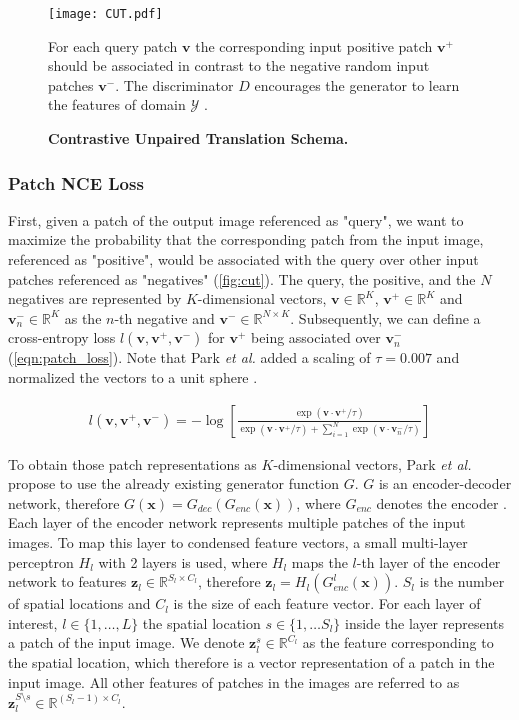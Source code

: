 \documentclass[a4paper,11pt, DIV=12]{scrartcl}
\newcommand{\x}{\boldsymbol{x}}
\newcommand{\vp}{\boldsymbol{v}^+}
\newcommand{\vm}{\boldsymbol{v}^-}
\newcommand{\ve}{\boldsymbol{v}}
\begin{document}
\begin{figure}[htp!]
   \centering
   \texttt{[image: CUT.pdf]}
   \caption{
      \textbf{Contrastive Unpaired Translation Schema.}}
   For \textcolor{query}{each query patch} $\ve$ the \textcolor{positive}{corresponding input positive patch} $\vp$ should be associated in contrast to the \textcolor{negative}{negative random input patches} $\vm$.
   The discriminator $D$ encourages the generator to learn the features of domain $\mathcal{Y}$ \cite{cut}.
   \label{fig:cut}
\end{figure}

\subsubsection*{Patch NCE Loss}
First, given a patch of the output image referenced as "query", we want to maximize the probability that the corresponding
patch from the input image, referenced as "positive", would be associated with the query over other input patches referenced
as "negatives" (\autoref{fig:cut}).
The query, the positive, and the $N$ negatives are represented by $K$-dimensional vectors, $\ve \in \mathbb{R}^K$, $\vp \in \mathbb{R}^K$
and $\vm_n \in \mathbb{R}^K$ as the $n$-th negative and $\ve^- \in \mathbb{R}^{N \times K}$.
Subsequently, we can define a cross-entropy loss $l(\ve, \vp, \vm)$ for $\vp$ being associated over $\vm_n$ (\autoref{eqn:patch_loss}).
Note that Park \textit{et al.} added a scaling of $\tau = 0.007$ and normalized the vectors to a unit sphere \cite{cut}.

\begin{equation}
   \label{eqn:patch_loss}
   \begin{aligned}
      l(\ve, \vp, \vm) = - \log \left[ \frac{\exp(\ve \cdot \vp / \tau)}{\exp(\ve \cdot \vp / \tau) + \sum_{i=1}^N\exp(\ve \cdot \ve_n^- / \tau)}\right]
   \end{aligned}
\end{equation}

To obtain those patch representations as $K$-dimensional vectors, Park \textit{et al.} propose to use the already existing
generator function $G$. $G$ is an encoder-decoder network, therefore $G(\x) = G_{dec}(G_{enc}(\x))$, where $G_{enc}$ denotes the encoder \cite{cut}.
Each layer of the encoder network represents multiple patches of the input images. To map this layer to condensed feature vectors,
a small multi-layer perceptron $H_l$ with 2 layers is used, where $H_l$ maps the $l$-th layer of the encoder network to features
$\boldsymbol{z}_l \in \mathbb{R}^{S_l \times C_l}$, therefore $\boldsymbol{z}_l = H_l(G_{enc}^l(\x))$.
$S_l$ is the number of spatial locations and $C_l$ is the size of each feature vector.
For each layer of interest, $l \in \{1, \dots, L\}$ the spatial location $s \in \{1, \dots S_l\}$ inside the layer represents a patch of the input image.
We denote $\boldsymbol{z}_l^s \in \mathbb{R}^{C_l}$ as the feature corresponding to the spatial location, which therefore is a vector representation of a patch
in the input image. All other features of patches in the images are referred to as $\boldsymbol{z}_l^{S \setminus s} \in \mathbb{R}^{(S_l - 1) \times C_l}$.
\end{document}
